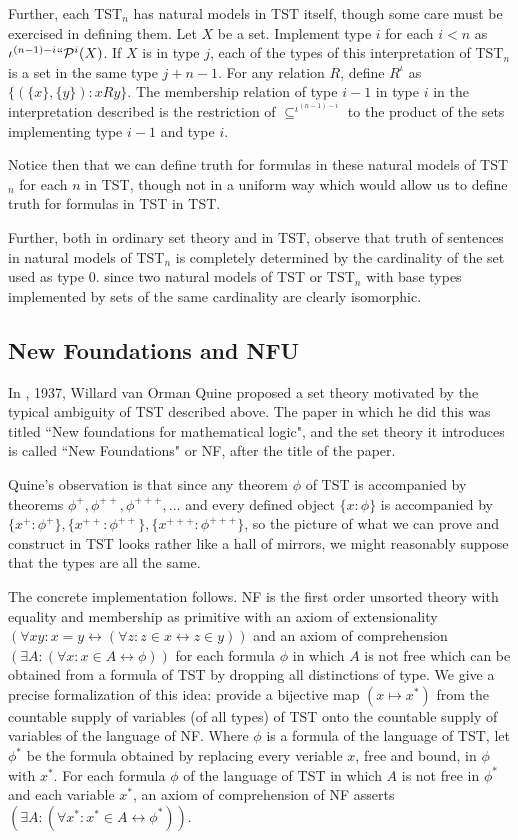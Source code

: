 \documentclass[112pt]{article}
\begin{document}
Further, each TST$_n$ has natural models in TST itself, though some care must be exercised in defining them.  Let $X$ be a set.  Implement type $i$ for each $i<n$ as
$\iota^{(n-1)-i}``{\cal P}^i(X)$.  If $X$ is in type $j$, each of the types of this interpretation of TST$_n$ is a set in the same type $j+n-1$.  For any relation $R$, define
$R^{\iota}$ as $\{(\{x\},\{y\}):x R y\}$.  The membership relation of type $i-1$ in type $i$ in the interpretation described is the restriction of $\subseteq^{\iota^{(n-1)-i}}$ to
the product of the sets implementing type $i-1$ and type $i$.

Notice then that we can define truth for formulas in these natural models of TST$_n$ for each $n$ in TST, though not in a uniform way which would allow us to define truth for formulas
in TST in TST.

Further, both in ordinary set theory and in TST, observe that truth of sentences in natural models of TST$_n$ is completely determined by the cardinality of the set used as type 0.
since two natural models of TST or TST$_n$ with base types implemented by sets of the same cardinality are clearly isomorphic. 

\newpage

\subsection{New Foundations and NFU}

In \cite{nf}, 1937, Willard van Orman Quine proposed a set theory motivated by the typical ambiguity of TST described above.  The paper in which he did this was titled ``New foundations for mathematical logic", and the set theory it introduces is called ``New Foundations" or NF, after the title of the paper.

Quine's observation is that since any theorem $\phi$ of TST is accompanied by theorems $\phi^+, \phi^{++}, \phi^{+++}, \ldots$ and every defined object $\{x:\phi\}$ is accompanied by
$\{x^+:\phi^+\},\{x^{++}:\phi^{++}\},\{x^{+++}:\phi^{+++}\}$, so the picture of what we can prove and construct in TST looks rather like a hall of mirrors, we might reasonably suppose that the types are all the same.

The concrete implementation follows.  NF is the first order unsorted theory with equality and membership as primitive with an axiom of extensionality $(\forall xy:x=y \leftrightarrow (\forall z:z \in x \leftrightarrow z\in y))$ and an axiom of comprehension $(\exists A:(\forall x:x \in A \leftrightarrow \phi))$ for each formula $\phi$ in which $A$ is not free which can be obtained from a formula of TST by dropping all distinctions of type.  We give a precise formalization of this idea:  provide a bijective map $(x \mapsto x^*)$ from the countable supply of variables (of all types) of TST onto the countable supply of variables of the language of NF.  Where $\phi$ is a formula of the language of TST, let $\phi^*$ be the formula obtained by replacing every veriable $x$, free and bound,
in $\phi$ with $x^*$. For each formula $\phi$ of the language of TST in which $A$ is not free in $\phi^*$ and each variable $x^*$, an axiom of comprehension of NF asserts $(\exists A:(\forall x^*:x^* \in A \leftrightarrow \phi^*))$.
\end{document}
